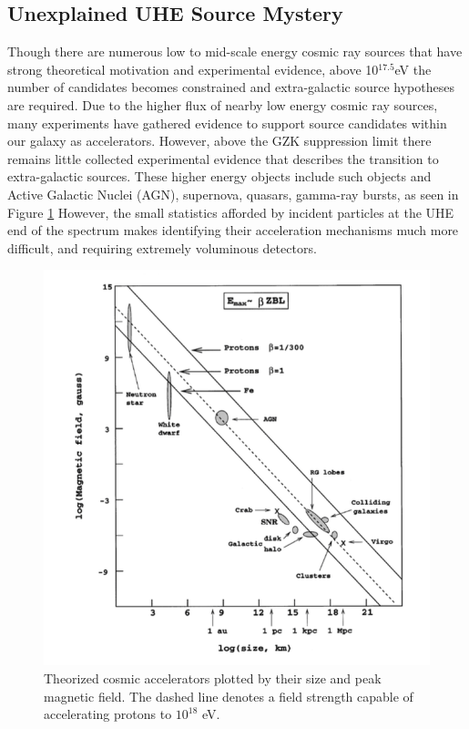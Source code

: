 		
	\subsection{Unexplained UHE Source Mystery}
		Though there are numerous low to mid-scale energy cosmic ray sources that have strong theoretical motivation and experimental evidence, above 10$^{17.5}$eV the number of candidates becomes constrained and extra-galactic source hypotheses are required. \cite{RevModPhys.71.S33}  Due to the higher flux of nearby low energy cosmic ray sources, many experiments have gathered evidence to support source candidates within our galaxy as accelerators.  However, above the GZK suppression limit there remains little collected experimental evidence that describes the transition to extra-galactic sources. These higher energy objects include such objects and Active Galactic Nuclei (AGN), supernova, quasars, gamma-ray bursts, as seen in Figure \ref{fig:cosmicAccels}  However, the small statistics afforded by incident particles at the UHE end of the spectrum makes identifying their acceleration mechanisms much more difficult, and requiring extremely voluminous detectors.

\begin{figure}
	\centering
	\includegraphics[width=\textwidth]{figures/cosmicAccelerators}
	\caption{Theorized cosmic accelerators plotted by their size and peak magnetic field.  The dashed line denotes 
a field strength capable of accelerating protons to $10^{18}$ eV. \cite{RevModPhys.71.S33} }
	\label{fig:cosmicAccels}
\end{figure}


